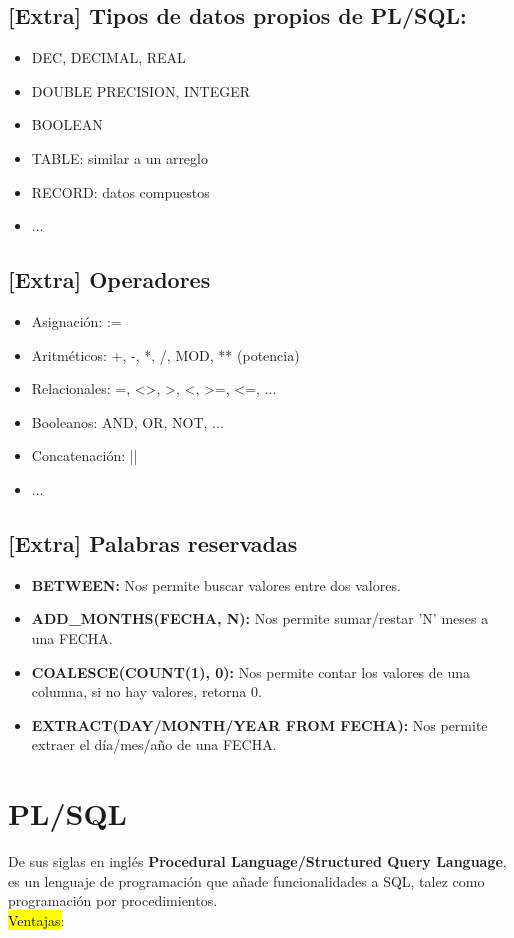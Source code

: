 \documentclass{templateNote}
\begin{document}
\subsection{[Extra] Tipos de datos propios de PL/SQL:}
\begin{itemize}
    \item DEC, DECIMAL, REAL
    \item DOUBLE PRECISION, INTEGER
    \item BOOLEAN
    \item TABLE: similar a un arreglo
    \item RECORD: datos compuestos
    \item ...
\end{itemize}

\subsection{[Extra] Operadores}
\begin{itemize}
    \item Asignación: :=
    \item Aritméticos: +, -, *, /, MOD, ** (potencia)
    \item Relacionales: =, <>, >, <, >=, <=, ...
    \item Booleanos: AND, OR, NOT, ...
    \item Concatenación: ||
    \item ...
\end{itemize}

\subsection{[Extra] Palabras reservadas}
\begin{itemize}
    \item \textbf{BETWEEN:} Nos permite buscar valores entre dos valores.
    \item \textbf{ADD\_MONTHS(FECHA, N):} Nos permite sumar/restar 'N' meses a una FECHA.
    \item \textbf{COALESCE(COUNT(1), 0):} Nos permite contar los valores de una columna, si no hay valores, retorna 0.
    \item \textbf{EXTRACT(DAY/MONTH/YEAR FROM FECHA):} Nos permite extraer el d\'ia/mes/año de una FECHA.
\end{itemize}
\newpage
\section{PL/SQL}
\indent
De sus siglas en inglés \textbf{Procedural Language/Structured Query Language}, es un lenguaje de programación que añade funcionalidades a SQL, talez como programación por procedimientos.\\
\hl{Ventajas}:
\end{document}
